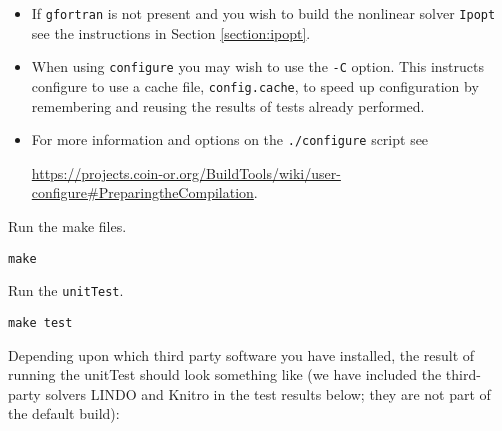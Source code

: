\documentclass[11pt]{article}
\renewcommand{\_}{{\char"5F}}
\renewcommand{\{}{{\char"7B}}
\renewcommand{\}}{{\char"7D}}
\renewcommand{\^}{{\char"0D}}
\renewcommand{\'}{{\char"0D}}
\begin{document}
\vskip 8pt

\begin{itemize}
\item If {\tt gfortran} is not present and you  wish to build the nonlinear solver {\tt Ipopt} see the instructions in Section \ref{section:ipopt}.

\item When using {\tt configure} you may wish to use the {\tt -C} option. This   instructs configure to use a cache file, {\tt config.cache}, to speed up configuration by remembering and reusing the results of tests already performed.

\item For more information and options on the {\tt ./configure} script see


\url{https://projects.coin-or.org/BuildTools/wiki/user-configure#PreparingtheCompilation}.


\end{itemize}



  Run the make files.

\begin{verbatim}
make
\end{verbatim}

 Run the {\tt unitTest}.

\begin{verbatim}
make test
\end{verbatim}

Depending upon which third party software you have installed, the result of running the unitTest should look something like (we have included the third-party solvers LINDO and Knitro in the  test results below; they are not part of the default build):
\end{document}
